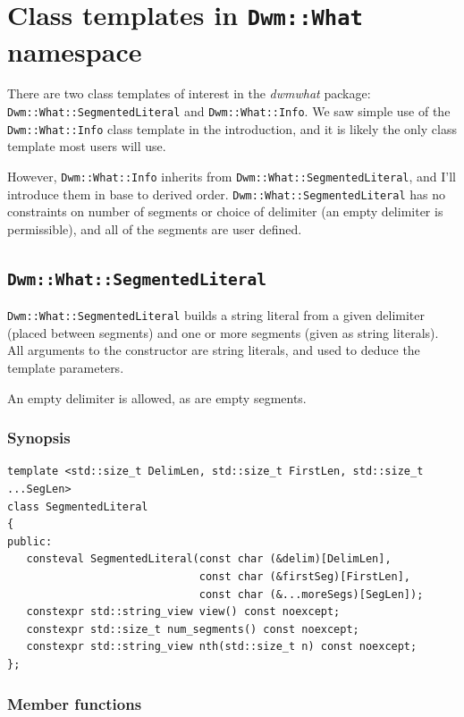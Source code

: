 \chapter{Class templates in \texttt{Dwm::What} namespace}
There are two class templates of interest in the {\em dwmwhat} package:
\texttt{Dwm::What::SegmentedLiteral} and \texttt{Dwm::What::Info}.
We saw simple use of the \texttt{Dwm::What::Info} class template in
the introduction, and it is likely the only class template most users
will use.

However, \texttt{Dwm::What::Info} inherits from
\texttt{Dwm::What::SegmentedLiteral}, and I'll introduce them in
base to derived order.  
\texttt{Dwm::What::SegmentedLiteral} has no constraints on number
of segments or choice of delimiter (an empty delimiter is permissible),
and all of the segments are user defined.

\section{\texttt{Dwm::What::SegmentedLiteral}}
\texttt{Dwm::What::SegmentedLiteral} builds a string literal from
a given delimiter (placed between segments) and one or more segments
(given as string literals).  All arguments to the constructor are
string literals, and used to deduce the template parameters.

An empty delimiter is allowed, as are empty segments.

\subsection{Synopsis}

\begin{verbatim}
template <std::size_t DelimLen, std::size_t FirstLen, std::size_t ...SegLen>
class SegmentedLiteral
{
public:
   consteval SegmentedLiteral(const char (&delim)[DelimLen],
                              const char (&firstSeg)[FirstLen],
                              const char (&...moreSegs)[SegLen]);
   constexpr std::string_view view() const noexcept;
   constexpr std::size_t num_segments() const noexcept;      
   constexpr std::string_view nth(std::size_t n) const noexcept;
};
\end{verbatim}

\subsection{Member functions}

